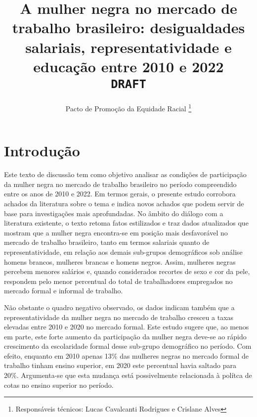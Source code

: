 \documentclass[12pt]{article}
\begin{document}
 

\linespread{1.1}

\title{%
  A mulher negra no mercado de trabalho brasileiro: desigualdades salariais, representatividade e educação entre 2010 e 2022\\
  \vspace{1cm}
  \Large \texttt{\MakeUppercase{DRAFT}}}

\author{Pacto de Promoção da Equidade Racial \thanks{Responsáveis técnicos: Lucas Cavalcanti Rodrigues e Crislane Alves}}


\maketitle

\section{Introdução}


\par Este texto de discussão tem como objetivo analisar as condições de participação da mulher negra no mercado de trabalho brasileiro no período compreendido entre os anos de 2010 e 2022. Em termos gerais, o presente estudo corrobora achados da literatura sobre o tema e indica novos achados que podem servir de base para investigações mais aprofundadas. No âmbito do diálogo com a literatura existente, o texto retoma fatos estilizados e traz dados atualizados que mostram que a mulher negra encontra-se em posição mais desfavorável no mercado de trabalho brasileiro, tanto em termos salariais quanto de representatividade, em relação aos demais sub-grupos de\-mo\-grá\-fi\-cos sob análise \textemdash homens brancos, mulheres brancas e homens negros. Assim, mulheres negras percebem menores salários e, quando considerados recortes de sexo e cor da pele, respondem pelo menor percentual do total de trabalhadores empregados no mercado formal e informal de trabalho. 

\par Não obstante o quadro negativo observado, os dados indicam também que a representatividade da mulher negra no mercado de trabalho cresceu a taxas elevadas entre 2010 e 2020 no mercado formal. Este estudo sugere que, ao menos em parte, este forte aumento da participação da mulher negra deve-se ao rápido crescimento da escolaridade formal desse sub-grupo demográfico no período. Com efeito, enquanto em 2010 apenas 13\% das mulheres negras no mercado formal de trabalho tinham ensino superior, em 2020 este percentual havia saltado para 20\%. Argumenta-se que esta mudança está possivelmente relacionada à polítca de cotas no ensino superior no período.
\end{document}
